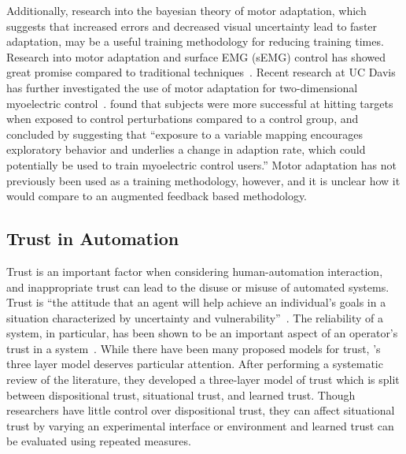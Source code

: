 Additionally, research into the bayesian theory of motor adaptation, which suggests that increased errors and decreased visual uncertainty lead to faster adaptation, may be a useful training methodology for reducing training times.
Research into motor adaptation and surface EMG (sEMG) control has showed great promise compared to traditional techniques~\citep{RN33}.
Recent research at UC Davis has further investigated the use of motor adaptation for two-dimensional myoelectric control~\citep{RN35}.
\citeauthor{RN35} found that subjects were more successful at hitting targets when exposed to control perturbations compared to a control group, and concluded by suggesting that ``exposure to a variable mapping encourages exploratory behavior and underlies a change in adaption rate, which could potentially be used to train myoelectric control users.''
Motor adaptation has not previously been used as a training methodology, however, and it is unclear how it would compare to an augmented feedback based methodology.

\subsection{Trust in Automation}
Trust is an important factor when considering human-automation interaction, and inappropriate trust can lead to the disuse or misuse of automated systems.
Trust is ``the attitude that an agent will help achieve an individual's goals in a situation characterized by uncertainty and vulnerability''~\citep{lee_trust_2004}.
The reliability of a system, in particular, has been shown to be an important aspect of an operator's trust in a system~\citep{RN38}.
While there have been many proposed models for trust, \citeauthor{RN39}'s three layer model deserves particular attention.
After performing a systematic review of the literature, they developed a three-layer model of trust which is split between dispositional trust, situational trust, and learned trust.
Though researchers have little control over dispositional trust, they can affect situational trust by varying an experimental interface or environment and learned trust can be evaluated using repeated measures.

